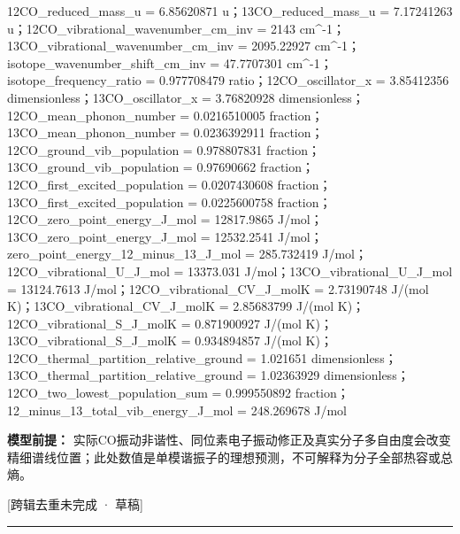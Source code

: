 \documentclass[UTF8,11pt,a4paper]{ctexart}
\begin{document}
12CO\_reduced\_mass\_u = 6.85620871 u；13CO\_reduced\_mass\_u = 7.17241263 u；12CO\_vibrational\_wavenumber\_cm\_inv = 2143 cm\textasciicircum{}-1；13CO\_vibrational\_wavenumber\_cm\_inv = 2095.22927 cm\textasciicircum{}-1；isotope\_wavenumber\_shift\_cm\_inv = 47.7707301 cm\textasciicircum{}-1；isotope\_frequency\_ratio = 0.977708479 ratio；12CO\_oscillator\_x = 3.85412356 dimensionless；13CO\_oscillator\_x = 3.76820928 dimensionless；12CO\_mean\_phonon\_number = 0.0216510005 fraction；13CO\_mean\_phonon\_number = 0.0236392911 fraction；12CO\_ground\_vib\_population = 0.978807831 fraction；13CO\_ground\_vib\_population = 0.97690662 fraction；12CO\_first\_excited\_population = 0.0207430608 fraction；13CO\_first\_excited\_population = 0.0225600758 fraction；12CO\_zero\_point\_energy\_J\_mol = 12817.9865 J/mol；13CO\_zero\_point\_energy\_J\_mol = 12532.2541 J/mol；zero\_point\_energy\_12\_minus\_13\_J\_mol = 285.732419 J/mol；12CO\_vibrational\_U\_J\_mol = 13373.031 J/mol；13CO\_vibrational\_U\_J\_mol = 13124.7613 J/mol；12CO\_vibrational\_CV\_J\_molK = 2.73190748 J/(mol K)；13CO\_vibrational\_CV\_J\_molK = 2.85683799 J/(mol K)；12CO\_vibrational\_S\_J\_molK = 0.871900927 J/(mol K)；13CO\_vibrational\_S\_J\_molK = 0.934894857 J/(mol K)；12CO\_thermal\_partition\_relative\_ground = 1.021651 dimensionless；13CO\_thermal\_partition\_relative\_ground = 1.02363929 dimensionless；12CO\_two\_lowest\_population\_sum = 0.999550892 fraction；12\_minus\_13\_total\_vib\_energy\_J\_mol = 248.269678 J/mol\par
\noindent\textbf{模型前提：}
实际CO振动非谐性、同位素电子振动修正及真实分子多自由度会改变精细谱线位置；此处数值是单模谐振子的理想预测，不可解释为分子全部热容或总熵。\par
\noindent\textcolor{red!65!black}{[跨辑去重未完成 · 草稿]} \par
\medskip\hrule\medskip
{}
\end{document}
